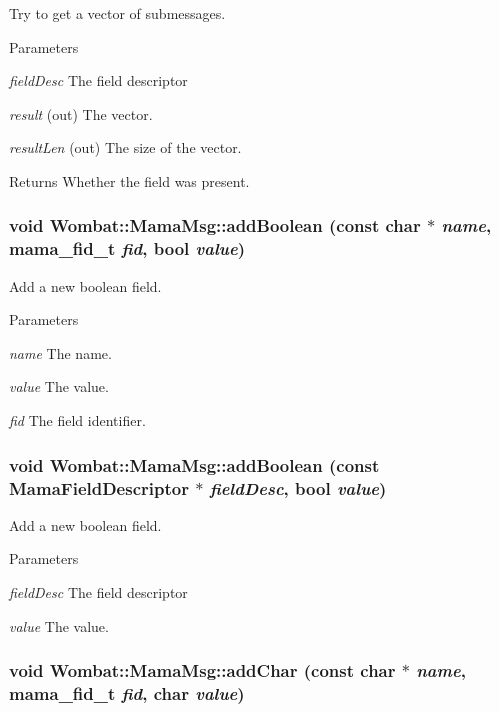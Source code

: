 Try to get a vector of submessages. 
\begin{DoxyParams}{Parameters}
\item[{\em fieldDesc}]The field descriptor \item[{\em result}](out) The vector. \item[{\em resultLen}](out) The size of the vector. \end{DoxyParams}
\begin{DoxyReturn}{Returns}
Whether the field was present. 
\end{DoxyReturn}
\hypertarget{classWombat_1_1MamaMsg_ab656fe99f4fbccfa1ec2c60a65227186}{
\subsubsection[{addBoolean}]{\setlength{\rightskip}{0pt plus 5cm}void Wombat::MamaMsg::addBoolean (const char $\ast$ {\em name}, \/  mama\_\-fid\_\-t {\em fid}, \/  bool {\em value})}}
\label{classWombat_1_1MamaMsg_ab656fe99f4fbccfa1ec2c60a65227186}


Add a new boolean field. 
\begin{DoxyParams}{Parameters}
\item[{\em name}]The name. \item[{\em value}]The value. \item[{\em fid}]The field identifier. \end{DoxyParams}
\hypertarget{classWombat_1_1MamaMsg_a0bbe0eaea35407e761f2709248177494}{
\subsubsection[{addBoolean}]{\setlength{\rightskip}{0pt plus 5cm}void Wombat::MamaMsg::addBoolean (const {\bf MamaFieldDescriptor} $\ast$ {\em fieldDesc}, \/  bool {\em value})}}
\label{classWombat_1_1MamaMsg_a0bbe0eaea35407e761f2709248177494}


Add a new boolean field. 
\begin{DoxyParams}{Parameters}
\item[{\em fieldDesc}]The field descriptor \item[{\em value}]The value. \end{DoxyParams}
\hypertarget{classWombat_1_1MamaMsg_acc9f495c3524e4b5accd201a6c53dd01}{
\subsubsection[{addChar}]{\setlength{\rightskip}{0pt plus 5cm}void Wombat::MamaMsg::addChar (const char $\ast$ {\em name}, \/  mama\_\-fid\_\-t {\em fid}, \/  char {\em value})}}
\label{classWombat_1_1MamaMsg_acc9f495c3524e4b5accd201a6c53dd01}


